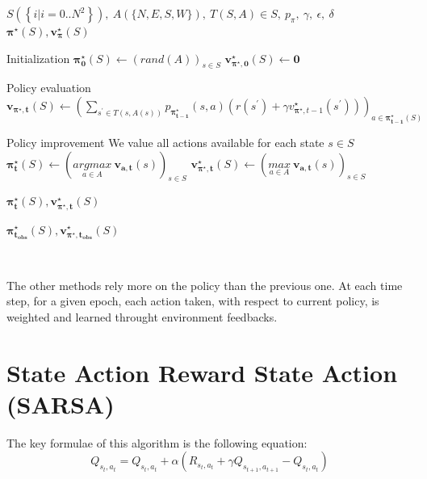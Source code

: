 \documentclass{cfg}
\begin{document}
\begin{algorithmic} 
    \REQUIRE $S(\left\{i|i=0..N^2\right\}),~ A(\{N, E, S, W\}),~ T(S, A) \in S,~ p_{\pi},~ \gamma,~ \epsilon,~ \delta$
    \ENSURE $\mathbf{\pi^\star}(S), \mathbf{v_{\pi}^{\star}}(S)$
    \STATE


    \STATE\COMMENT Initialization
    \STATE $\mathbf{\pi^{\star}_0}(S) \gets (rand(A))_{s \in S}$
    \STATE $\mathbf{v^{\star}_{\mathbf{\pi^{\star}}, 0}}(S) \gets \mathbf{0}$
    \STATE

        \STATE\COMMENT Policy evaluation
        \STATE $
            \mathbf{v_{\mathbf{\pi^{\star}}, t}}(S) 
            \gets 
            \left(
                \sum\limits_{s^\prime \in T(s, A(s))} 
                p_{\mathbf{\pi^{\star}_{t-1}}}(s, a)\left( 
                    r(s^\prime) 
                    + \gamma v_{\mathbf{\pi^{\star}}, t-1}^{\star}(s^\prime) 
                \right)
            \right)_{a\in\mathbf{\pi^{\star}_{t-1}}(S)}
        $
        \STATE

        \STATE\COMMENT Policy improvement
        \STATE\COMMENT We value all actions available for each state $s \in S$
        \STATE $
            \mathbf{\pi^\star_{t}}(S) 
            \gets 
            \left(
                \underset{a \in A}{argmax}~
                \mathbf{v_{a, t}}(s)
            \right)_{s\in S}
        $
        \STATE $
            \mathbf{v_{\mathbf{\pi^{\star}}, t}^{\star}}(S) 
            \gets 
            \left(
                \underset{a \in A}{max}~
                \mathbf{v_{a, t}}(s)
            \right)_{s \in S}
        $

            \RETURN $\mathbf{\pi^\star_t}(S), \mathbf{v_{\mathbf{\pi^{\star}}, t}^{\star}}(S)$
        \ENDIF
    \ENDFOR

    \RETURN $\mathbf{\pi^\star_{t_{obs}}}(S), \mathbf{v_{\mathbf{\pi^{\star}}, t_{obs}}^{\star}}(S)$
\end{algorithmic}
\ 

The other methods rely more on the policy than the previous one.
At each time step, for a given epoch, each action taken, with respect to current policy, is weighted and learned throught environment feedbacks.

\newpage
\section{State Action Reward State Action (SARSA)}
\noindent The key formulae of this algorithm is the following equation:
\begin{equation}
    Q_{s_t, a_t} = Q_{s_t, a_t} + \alpha (R_{s_t, a_t} + \gamma Q_{s_{t+1}, a_{t+1}} - Q_{s_t, a_t})
\end{equation}
\end{document}

